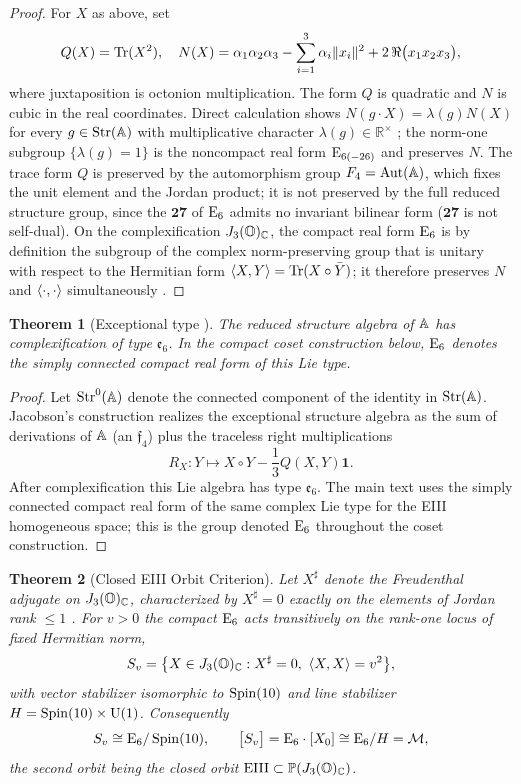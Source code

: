 \documentclass[pdflatex,sn-mathphys-num]{sn-jnl}
\theoremstyle{thmstyleone}
\newtheorem{theorem}{Theorem}
\theoremstyle{thmstylethree}%
\theoremstyle{thmstyletwo}%
\begin{document}
\begin{proof}
For $X$ as above, set
\[
  Q(X)=\operatorname{Tr}(X^{2}),
  \quad
  N(X)=\alpha_{1}\alpha_{2}\alpha_{3}-\sum_{i=1}^{3}\alpha_{i}\|x_{i}\|^{2}
        +2\,\Re\bigl(x_{1}x_{2}x_{3}\bigr),
\]
where juxtaposition is octonion multiplication. The form $Q$ is quadratic and
$N$ is cubic in the real coordinates. Direct calculation shows
$N(g\cdot X)=\lambda(g)N(X)$ for every $g\in\operatorname{Str}(\mathbb{A})$ with multiplicative
character $\lambda(g)\in\mathbb R^{\times}$ \cite{Jacobson:1968}; the norm-one
subgroup $\{\lambda(g)=1\}$ is the noncompact real form $\mathrm{E}_{6(-26)}$ and
preserves $N$. The trace form $Q$ is preserved by the automorphism group
$F_4=\operatorname{Aut}(\mathbb{A})$, which fixes the unit element and the Jordan
product; it is not preserved by the full reduced structure group, since the
$\mathbf{27}$ of $\mathrm{E}_6$ admits no invariant bilinear form ($\mathbf{27}$ is
not self-dual). On the complexification $J_3(\mathbb{O})_{\mathbb C}$, the compact real form
$\mathrm{E}_{6}$ is by definition the subgroup of the complex norm-preserving group
that is unitary with respect to the Hermitian form
$\langle X,Y\rangle=\operatorname{Tr}(X\circ\bar Y)$; it therefore preserves $N$ and
$\langle \cdot,\cdot\rangle$ simultaneously \cite{Springer:2000}.
\end{proof}

\begin{theorem}[Exceptional type {\cite{Springer:2000}}]\label{thm:E6}
The reduced structure algebra of $\mathbb{A}$ has complexification of type
$\mathfrak e_{6}$. In the compact coset construction below, $\mathrm{E}_{6}$ denotes the
simply connected compact real form of this Lie type.
\end{theorem}

\begin{proof}
Let $\operatorname{Str}^{0}(\mathbb{A})$ denote the connected component of the identity in
$\operatorname{Str}(\mathbb{A})$. Jacobson's construction \cite{Jacobson:1968} realizes the
exceptional structure algebra as the sum of derivations of $\mathbb{A}$ (an
$\mathfrak f_{4}$) plus the traceless right multiplications
\[
  R_{X}: Y\mapsto X\circ Y-\frac13 Q(X,Y)\mathbf 1.
\]
After complexification this Lie algebra has type $\mathfrak e_{6}$. The main
text uses the simply connected compact real form of the same complex Lie type
for the EIII homogeneous space; this is the group denoted $\mathrm{E}_{6}$ throughout
the coset construction.
\end{proof}

\begin{theorem}[Closed EIII Orbit Criterion]\label{thm:OrbitClass}
Let $X^{\sharp}$ denote the Freudenthal adjugate on $J_3(\mathbb{O})_{\mathbb C}$, characterized
by $X^{\sharp}=0$ exactly on the elements of Jordan rank $\le1$
\cite{Springer:2000,McCrimmon:2004}. For $v>0$ the compact $\mathrm{E}_{6}$ acts
transitively on the rank-one locus of fixed Hermitian norm,
\[
  S_{v}
  =
  \bigl\{X\in\AlbertC : X^{\sharp}=0,\ \Herm{X}{X}=v^{2}\bigr\},
\]
with vector stabilizer isomorphic to $\operatorname{Spin}(10)$ and line stabilizer
$H=\operatorname{Spin}(10) \times \mathrm{U(1)}$. Consequently
\[
  S_{v}\cong \mathrm{E}_{6}/\operatorname{Spin}(10),
  \qquad
  \bigl[S_{v}\bigr]=\mathrm{E}_{6}\cdot[X_{0}]\cong\mathrm{E}_{6}/H=\mathcal{M},
\]
the second orbit being the closed orbit
$\mathrm{EIII}\subset\mathbb P(J_3(\mathbb{O})_{\mathbb C})$.
\end{theorem}
\end{document}
